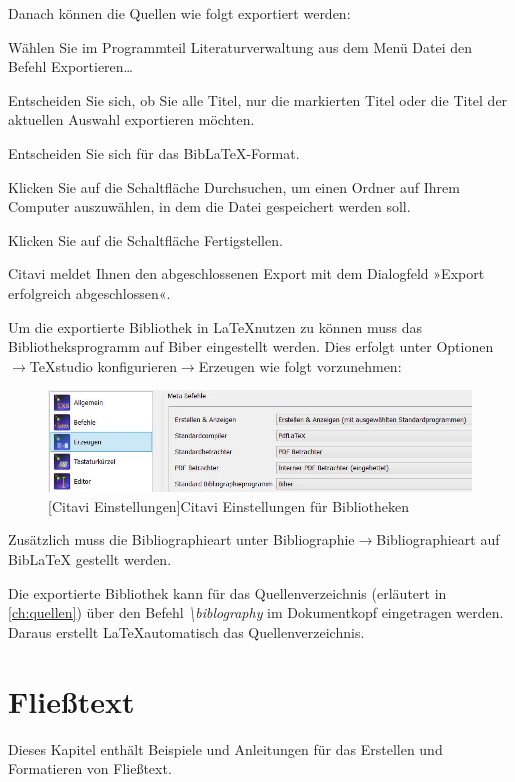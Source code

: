 \documentclass[12pt,a4paper, listof=entryprefix, bibliography=totocnumbered,toc=listofnumbered,lof=listofnumbered]{scrartcl}
\newcounter{verzeichnis}
\begin{document}
Danach können die Quellen wie folgt exportiert werden:
\begin{compactitem}
	\item Wählen Sie im Programmteil Literaturverwaltung aus dem Menü Datei den Befehl Exportieren…
	\item Entscheiden Sie sich, ob Sie alle Titel, nur die markierten Titel oder die Titel der aktuellen Auswahl exportieren möchten.
	\item Entscheiden Sie sich für das BibLaTeX-Format.
	\item Klicken Sie auf die Schaltfläche Durchsuchen, um einen Ordner auf Ihrem Computer auszuwählen, in dem die Datei gespeichert werden soll.
	\item Klicken Sie auf die Schaltfläche Fertigstellen.
	\item Citavi meldet Ihnen den abgeschlossenen Export mit dem Dialogfeld »Export erfolgreich abgeschlossen«.
\end{compactitem}

Um die exportierte Bibliothek in \LaTeX nutzen zu können muss das Bibliotheksprogramm auf Biber eingestellt werden. Dies erfolgt unter Optionen$\rightarrow$TeXstudio konfigurieren$\rightarrow$Erzeugen wie folgt vorzunehmen:
\begin{figure}[H]
	\centering
	\includegraphics[width=0.8\linewidth]{Bilder/biber.jpg} 
	[Citavi Einstellungen]{Citavi Einstellungen für Bibliotheken}
	\label{fig:citavi}
\end{figure}

Zusätzlich muss die Bibliographieart unter Bibliographie$\rightarrow$Bibliographieart auf BibLaTeX gestellt werden.

Die exportierte Bibliothek kann für das Quellenverzeichnis (erläutert in \ref{ch:quellen}) über den Befehl \textit{\textbackslash biblography} im Dokumentkopf eingetragen werden. Daraus erstellt \LaTeX automatisch das Quellenverzeichnis.

\pagebreak

\section{Flie{\ss}text}
\label{ch:fliesstext}
Dieses Kapitel enthält Beispiele und Anleitungen für das Erstellen und Formatieren von Fließtext.
\end{document}

